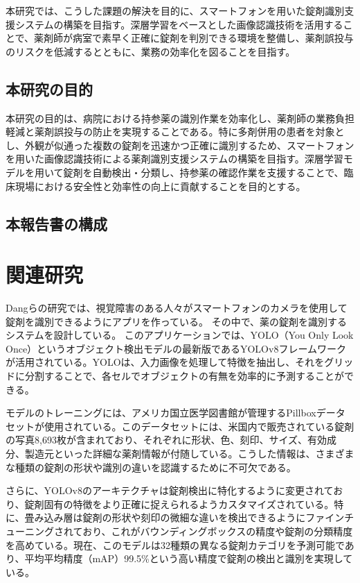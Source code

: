 \documentclass[12pt]{article}
\begin{document}
本研究では、こうした課題の解決を目的に、スマートフォンを用いた錠剤識別支援システムの構築を目指す。深層学習をベースとした画像認識技術を活用することで、薬剤師が病室で素早く正確に錠剤を判別できる環境を整備し、薬剤誤投与のリスクを低減するとともに、業務の効率化を図ることを目指す。


\subsection{本研究の目的}
本研究の目的は、病院における持参薬の識別作業を効率化し、薬剤師の業務負担軽減と薬剤誤投与の防止を実現することである。特に多剤併用の患者を対象とし、外観が似通った複数の錠剤を迅速かつ正確に識別するため、スマートフォンを用いた画像認識技術による薬剤識別支援システムの構築を目指す。深層学習モデルを用いて錠剤を自動検出・分類し、持参薬の確認作業を支援することで、臨床現場における安全性と効率性の向上に貢献することを目的とする。
\subsection{本報告書の構成}

\newpage

\section{関連研究}\label{sec2}
Dangらの研究\cite{Dang_2024}では、視覚障害のある人々がスマートフォンのカメラを使用して錠剤を識別できるようにアプリを作っている。
その中で、薬の錠剤を識別するシステムを設計している。
このアプリケーションでは、YOLO（You Only Look Once）というオブジェクト検出モデルの最新版であるYOLOv8フレームワークが活用されている。YOLOは、入力画像を処理して特徴を抽出し、それをグリッドに分割することで、各セルでオブジェクトの有無を効率的に予測することができる。

モデルのトレーニングには、アメリカ国立医学図書館が管理するPillboxデータセットが使用されている。このデータセットには、米国内で販売されている錠剤の写真8,693枚が含まれており、それぞれに形状、色、刻印、サイズ、有効成分、製造元といった詳細な薬剤情報が付随している。こうした情報は、さまざまな種類の錠剤の形状や識別の違いを認識するために不可欠である。

さらに、YOLOv8のアーキテクチャは錠剤検出に特化するように変更されており、錠剤固有の特徴をより正確に捉えられるようカスタマイズされている。特に、畳み込み層は錠剤の形状や刻印の微細な違いを検出できるようにファインチューニングされており、これがバウンディングボックスの精度や錠剤の分類精度を高めている。現在、このモデルは32種類の異なる錠剤カテゴリを予測可能であり、平均平均精度（mAP）99.5\%という高い精度で錠剤の検出と識別を実現している。
\end{document}

